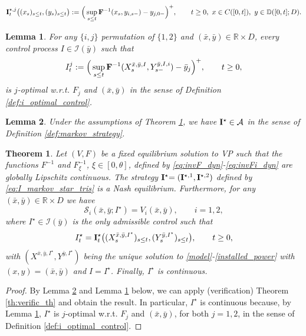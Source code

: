 \documentclass[10pt,a4paper]{amsart}
\newtheorem{theorem}{Theorem}
\newtheorem{lemma}{Lemma}
\newcommand{\NCL}[1]{\mathbb{D} ([0,{#1}];D)}
\def \R {\mathbb{R}}
\def\cS{{\mathcal S}}
\newcommand\contr{{\bf I}}
\begin{document}
\begin{equation}\label{eq:I_markov_star_tris}
\contr^{\star,j}_t\big((x_s)_{s\leq t},(y_s)_{s\leq t}\big): = \Big( \sup_{s\leq t} {\bf F}^{-1}(x_s,y_{i,s-}) - y_{j,0-} \Big)^+ , \qquad t\geq 0, \ x\in C([0,t]), \ y\in \NCL{t}.
\end{equation}

\begin{lemma}\label{lem:optimal}
For any $\{ i, j \}$ permutation of $\{ 1,2 \}$
 and $(\bar{x},\bar{y})\in \R\times {D}$, every control process $I\in\mathcal{I}(\bar y)$ such that 
\begin{equation}\label{eq:cond_Iit_bis}
I^j_t := \Big( \sup_{s\leq t} {\bf F}^{-1}(X^{\bar x, \bar y, I}_s , Y^{\bar y, I, i}_{s-}) - \bar y_{j} \Big)^+ , \qquad t\geq 0, 
\end{equation}
is $j$-optimal w.r.t. $F_j$ and $(\bar{x},\bar{y})$ in the sense of Definition \ref{def:i_optimal_control}. 
\end{lemma}

\begin{lemma}\label{lem:admissibility}
Under the assumptions of Theorem \ref{th_equilibrium}, we have $\contr^{\star}\in\mathcal{A}$ in the sense of Definition \ref{def:markov_strategy}. %
\end{lemma}

\begin{theorem}\label{th_equilibrium}
Let $(V,F)$ be a fixed equilibrium solution to VP {such that the functions ${F}^{-1}$ and ${F}^{-1}_{\xi}$, $\xi\in[0,\theta]$, defined by \eqref{eq:invF_dyn}-\eqref{eq:invFi_dyn} are globally Lipschitz continuous.} 
The strategy $\contr^{\star}{=(\contr^{\star,1},\contr^{\star,2})}$ defined by \eqref{eq:I_markov_star_tris} is a Nash equilibrium. Furthermore, for any $(\bar x , \bar y)\in \R\times D$ we have 
\begin{equation}\label{eq:nash_cond_th_bis}
\cS_i(\bar x,\bar y; I^{\star}) = V_i(\bar x,\bar y) , \qquad   i = 1,2,
\end{equation}
where $I^{\star}\in\mathcal{I}(\bar y)$ is the only admissible control such that 
\begin{equation}\label{eq:I_markov_star_bis}
I^{\star}_t = \contr_t^{\star}\big((X^{\bar x,\bar y,I^{\star}}_s)_{s\leq t}, (Y^{\bar y,I^{\star}}_{s})_{s\leq t}\big), \qquad t\geq 0,
\end{equation}
with $(X^{\bar x,\bar y,I^{\star}}, Y^{\bar y,I^{\star}})$ being the unique solution to \eqref{model}-\eqref{installed_power} with $(x,y) = (\bar x , \bar y)$ and $I = I^{\star}$. Finally, $I^{\star}$ is continuous.
\end{theorem}

\begin{proof} By Lemma \ref{lem:admissibility} and Lemma \ref{lem:optimal} below, we can apply (verification) Theorem \ref{th:verific_th} and obtain the result. In particular, $I^{\star}$ is continuous because, by Lemma \ref{lem:optimal}, $I^{\star}$ is $j$-optimal w.r.t. $F_j$ and $(\bar{x},\bar{y})$, for both $j=1,2$, in the sense of Definition \ref{def:i_optimal_control}.
\end{proof}
\end{document}
